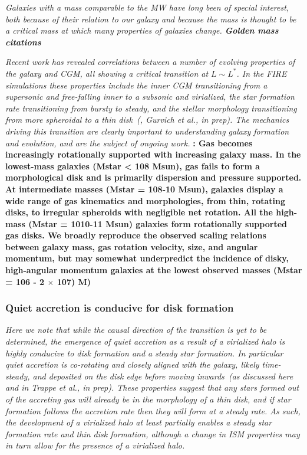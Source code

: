 \documentclass[fleqn,usenatbib]{mnras}
\begin{document}
\textit{
Galaxies with a mass comparable to the MW have long been of special interest, both because of their relation to our galaxy and because the mass is thought to be a critical mass at which many properties of galaxies change.
\textbf{Golden mass citations}
}

\textit{
Recent work has revealed correlations between a number of evolving properties of the galaxy and CGM, all showing a critical transition at $L \sim L^*$.
In the FIRE simulations these properties include the inner CGM transitioning from a supersonic and free-falling inner to a subsonic and virialized, the star formation rate transitioning from bursty to steady, and the stellar morphology transitioning from more spheroidal to a thin disk~(\citealt{Stern2020, Yu2021}, Gurvich et al., in prep).
The mechanics driving this transition are clearly important to understanding galaxy formation and evolution, and are the subject of ongoing work.
}
\textbf{
\cite{El-Badry2018a}:
Gas becomes increasingly rotationally supported with increasing galaxy mass. In the lowest-mass galaxies (Mstar < 108 Msun), gas fails to form a morphological disk and is primarily dispersion and pressure supported.
At intermediate masses (Mstar = 108-10 Msun), galaxies display a wide range of gas kinematics and morphologies, from thin, rotating disks, to irregular spheroids with negligible net rotation.
All the high-mass (Mstar = 1010-11 Msun) galaxies form rotationally supported gas disks.
We broadly reproduce the observed scaling relations between galaxy mass, gas rotation velocity, size, and angular momentum, but may somewhat underpredict the incidence of disky, high-angular momentum galaxies at the lowest observed masses (Mstar = 106 - 2 $\times$ 107) M)
}

\subsubsection{Quiet accretion is conducive for disk formation}

\textit{
Here we note that while the causal direction of the transition is yet to be determined, the emergence of quiet accretion as a result of a virialized halo is highly conducive to disk formation and a steady star formation.
In particular quiet accretion is co-rotating and closely aligned with the galaxy, likely time-steady, and deposited on the disk edge before moving inwards~(as discussed here and in Trappe et al., in prep).
These properties suggest that any stars formed out of the accreting gas will already be in the morphology of a thin disk, and if star formation follows the accretion rate then they will form at a steady rate.
As such, the development of a virialized halo at least partially enables a steady star formation rate and thin disk formation, although a change in ISM properties may in turn allow for the presence of a virialized halo.
}
\end{document}
